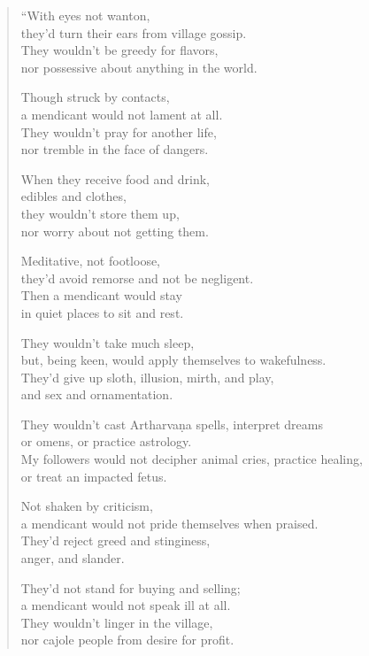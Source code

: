 \documentclass[12pt,openany]{book}%
\begin{document}
\begin{verse}
“With eyes not wanton, \\
they’d turn their ears from village gossip. \\
They wouldn’t be greedy for flavors, \\
nor possessive about anything in the world. 

Though struck by contacts, \\
a mendicant would not lament at all. \\
They wouldn’t pray for another life, \\
nor tremble in the face of dangers. 

When they receive food and drink, \\
edibles and clothes, \\
they wouldn’t store them up, \\
nor worry about not getting them. 

Meditative, not footloose, \\
they’d avoid remorse and not be negligent. \\
Then a mendicant would stay \\
in quiet places to sit and rest. 

They wouldn’t take much sleep, \\
but, being keen, would apply themselves to wakefulness. \\
They’d give up sloth, illusion, mirth, and play, \\
and sex and ornamentation. 

They wouldn’t cast \textsanskrit{Artharvaṇa} spells, interpret dreams \\
or omens, or practice astrology. \\
My followers would not decipher animal cries, practice healing, \\
or treat an impacted fetus. 

Not shaken by criticism, \\
a mendicant would not pride themselves when praised. \\
They’d reject greed and stinginess, \\
anger, and slander. 

They’d not stand for buying and selling; \\
a mendicant would not speak ill at all. \\
They wouldn’t linger in the village, \\
nor cajole people from desire for profit. 


\end{verse}
\end{document}
